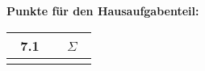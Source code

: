 \documentclass[twoside]{article}
\begin{document}
\pagestyle{fancy}
\fancyhead{}
\fancyfoot{}
\lhead{\memOneName\-\\\memOneNr}
\chead{}
\rhead{\memTwoName\-\\\memTwoNr}
\lfoot{}
\cfoot{\fachname}
\rfoot{}
\renewcommand{\footrulewidth}{0.4pt}



\thispagestyle{empty}
\-\vspace{0.5cm}
\begin{center}
	\fach
	\vspace{1.5cm}
	\gruppe
	\vspace{1.5cm}
	\memberOfGroup{\memOneName}{\memOneMail}{\memOneNr}
	\memberOfGroup{\memTwoName}{\memTwoMail}{\memTwoNr}
	\memberOfGroup{$ $}{$ $}{$ $}
	\memberOfGroup{$ $}{$ $}{$ $}
	\vspace{1cm}
	\datumf
	\vspace{1cm}
	
	\textbf{Punkte für den Hausaufgabenteil:}\\
	\vspace{1cm}
	\begin{tabular}{c|c}
	~7.1~&~$\Sigma$~	\\	\hline
		 &
	\end{tabular}
	
\end{center}
\newpage
\end{document}
